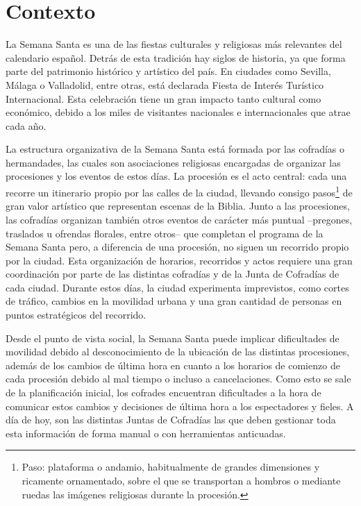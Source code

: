 \section{Contexto}\label{cap:contexto}

La Semana Santa es una de las fiestas culturales y religiosas más relevantes del calendario español. Detrás de esta tradición hay siglos de historia, ya que forma parte del patrimonio histórico y artístico del país. En ciudades como Sevilla, Málaga o Valladolid, entre otras, está declarada Fiesta de Interés Turístico Internacional. Esta celebración tiene un gran impacto tanto cultural como económico, debido a los miles de visitantes nacionales e internacionales que atrae cada año.

La estructura organizativa de la Semana Santa está formada por las cofradías o hermandades, las cuales son asociaciones religiosas encargadas de organizar las procesiones y los eventos de estos días. La procesión es el acto central: cada una recorre un itinerario propio por las calles de la ciudad, llevando consigo pasos\footnote{Paso: plataforma o andamio, habitualmente de grandes dimensiones y ricamente ornamentado, sobre el que se transportan a hombros o mediante ruedas las imágenes religiosas durante la procesión.} de gran valor artístico que representan escenas de la Biblia. Junto a las procesiones, las cofradías organizan también otros eventos de carácter más puntual --pregones, traslados u ofrendas florales, entre otros-- que completan el programa de la Semana Santa pero, a diferencia de una procesión, no siguen un recorrido propio por la ciudad. Esta organización de horarios, recorridos y actos requiere una gran coordinación por parte de las distintas cofradías y de la Junta de Cofradías de cada ciudad. Durante estos días, la ciudad experimenta imprevistos, como cortes de tráfico, cambios en la movilidad urbana y una gran cantidad de personas en puntos estratégicos del recorrido.

Desde el punto de vista social, la Semana Santa puede implicar dificultades de movilidad debido al desconocimiento de la ubicación de las distintas procesiones, además de los cambios de última hora en cuanto a los horarios de comienzo de cada procesión debido al mal tiempo o incluso a cancelaciones. Como esto se sale de la planificación inicial, los cofrades encuentran dificultades a la hora de comunicar estos cambios y decisiones de última hora a los espectadores y fieles. A día de hoy, son las distintas Juntas de Cofradías las que deben gestionar toda esta información de forma manual o con herramientas anticuadas.

